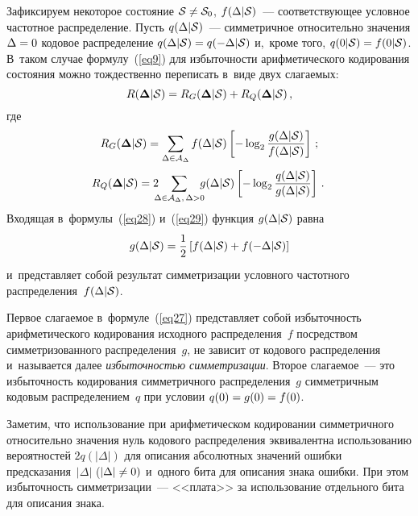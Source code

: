 \begin{multicols}{2}
Зафиксируем некоторое состояние ${\cal S}\hm\neq{\cal S}_0$, $f(\Delta|{\cal S})$~--- 
соответствующее условное частотное распределение. Пусть $q(\Delta|{\cal S})$~---  
симметричное относительно значения $\Delta\hm= 0$  кодовое распределение 
$q(\Delta|{\cal S})\hm= q(-\Delta|{\cal S})$ и,~кроме того, 
$q(0|{\cal S})\hm= f(0|{\cal S})$. В~таком случае формулу~(\ref{eq9})
 для избыточности арифметического кодирования состояния можно тождественно 
 переписать в~виде двух слагаемых:
\begin{equation}
\label{eq27}
R(\boldsymbol{\Delta}|{\cal S}) =
R_G(\boldsymbol{\Delta}|{\cal S)} + R_Q(\boldsymbol{\Delta}|{\cal S)} \,,
\end{equation}
где
\begin{equation}
\label{eq28}
R_G(\boldsymbol{\Delta}|{\cal S}) = \sum\limits_{\Delta\in{\cal A}_{\Delta}}
f(\Delta|{\cal S}) \left[-\log_{2}\displaystyle\frac{\displaystyle g(\Delta|{\cal S})\mathstrut}{\displaystyle f(\Delta|{\cal S})\mathstrut}\right]\,;
\end{equation}
\begin{equation}
\hspace*{-2mm}R_Q(\boldsymbol{\Delta}|{\cal S}) = 2\hspace*{-2mm}
 \sum\limits_{\Delta\in{\cal A}_{\Delta},\,\Delta>0}\hspace*{-2mm}
g(\Delta|{\cal S}) \left[-\log_{2}\fr{q(\Delta|{\cal S})}{g(\Delta|{\cal S})}\right]\,.
\!\!\label{eq29}
\end{equation}
Входящая в~формулы~(\ref{eq28}) и~(\ref{eq29}) функция $g(\Delta|{\cal S})$ равна
\begin{equation}
\label{eq30}
g(\Delta|{\cal S}) = \displaystyle\frac{\displaystyle 1\mathstrut}{\displaystyle 2\mathstrut} \left[ f(\Delta|{\cal S}) + f(-\Delta|{\cal S}) \right]
\end{equation}
и~представляет собой результат симметризации условного частотного 
распределения~$ f(\Delta|{\cal S})$.

Первое слагаемое в~формуле~(\ref{eq27}) представ\-ляет собой избыточность 
арифметического ко\-ди\-ро\-вания исходного распределения~$f$ посредством 
симметризованного распределения~$g$, не зависит от кодового распределения и~называется 
далее \textit{избыточностью симметризации}. 
Второе слагаемое~--- это избыточность кодирования симметричного распределения~$g$ 
симметричным кодовым распределением~$q$ при условии $q(0)\hm= g(0) \hm= f(0)$.

Заметим, что использование при арифметическом кодировании симметричного 
относительно значения нуль кодового распределения эквивалентна использованию 
вероятностей $2q(|\Delta|)$ для описания абсолютных значений ошибки 
предсказания~$|\Delta|$ ($|\Delta|\hm\neq 0)$ и~одного бита для описания знака ошибки. 
При этом избыточность симметризации~--- <<плата>> за использование отдельного бита 
для описания знака.


\end{multicols}
